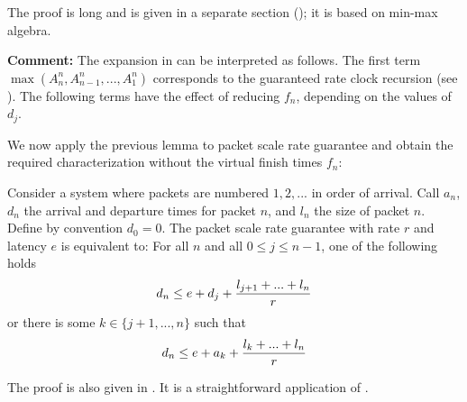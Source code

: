 The proof is long and is given in a separate section
(); it is based on min-max algebra.

\textbf{Comment: }The expansion in  can
be interpreted as follows. The first term $\max(A_n^n ,
A_{n-1}^n , ... ,
    A_1^n)$ corresponds to the guaranteed rate clock recursion
    (see ). The following terms have the
    effect of reducing $f_n$, depending on the values of $d_j$.


We now apply the previous lemma to packet scale rate guarantee
and obtain the required characterization without the virtual
finish times $f_n$:
\begin{theorem}
 Consider a system where packets are
numbered $1, 2, ...$ in order of arrival. Call $a_n$, $d_n$
the arrival and departure times for packet $n$, and $l_n$ the
size of packet $n$. Define by convention $d_0=0$. The packet
scale rate guarantee with rate $r$ and latency $e$ is
equivalent to: For all $n$ and all $0\leq j\leq n-1$, one of
the following holds
\begin{equation}\mylabel{eq-psrgmaxplus1}
 d_n \leq e + d_j + \frac{l_{j+1} + ... + l_n}{r}
 \end{equation}
or there is some $k \in \{j+1, ..., n\}$ such that
\begin{equation}\mylabel{eq-psrgmaxplus2}
 d_n \leq e + a_k + \frac{l_k + ... + l_n}{r}
\end{equation}
\end{theorem}
The proof is also given in . It is a
straightforward application of .

